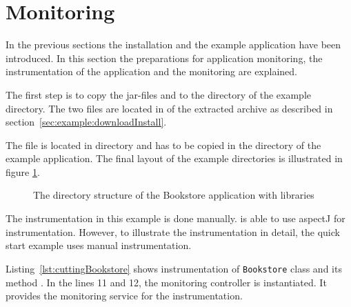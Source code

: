 \section{Monitoring}\label{sec:example:monitoring}

In the previous sections the \Kieker{} installation and the example application have been introduced. In this section the preparations for application monitoring, the instrumentation of the application and the monitoring are explained.

The first step is to copy the \Kieker{} jar-files \file{\monitoringJar} and \file{\commonJar} to the  directory of the example directory. The two files are located in  of the extracted \Kieker{} archive as described in section~\ref{sec:example:downloadInstall}.

The file \file{\commonsLoggingJar} is located in  directory and has to be copied in the  directory of the example application. The final layout of the example directories is illustrated in figure \ref{fig:KiekerBookstoreExample}.

\begin{figure}[H]
\begin{graybox}
\end{graybox}
\caption{The directory structure of the Bookstore application with \Kieker{} libraries}
\label{fig:KiekerBookstoreExample}
\end{figure}

\noindent The instrumentation in this example is done manually. \Kieker{} is able to use aspectJ for instrumentation. However, to illustrate the instrumentation in detail, the quick start example uses manual instrumentation.

Listing~\ref{lst:cuttingBookstore} shows instrumentation of \verb!Bookstore! class and its method . In the lines 11 and 12, the monitoring controller is instantiated. It provides the monitoring service for the instrumentation.


